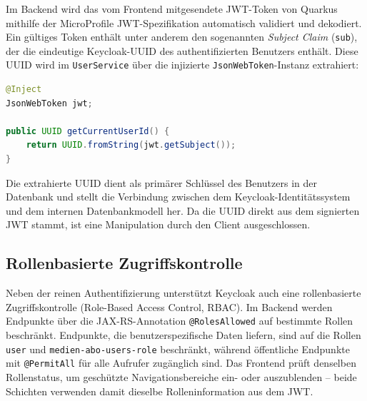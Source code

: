 Im Backend wird das vom Frontend mitgesendete JWT-Token von Quarkus mithilfe
der MicroProfile JWT-Spezifikation automatisch validiert und dekodiert. Ein
gültiges Token enthält unter anderem den sogenannten \textit{Subject Claim}
(\texttt{sub}), der die eindeutige Keycloak-UUID des authentifizierten Benutzers
enthält. Diese UUID wird im \texttt{UserService} über die injizierte
\texttt{JsonWebToken}-Instanz extrahiert:

\begin{lstlisting}[language=java, basicstyle=\ttfamily\small, caption={Extraktion der Benutzer-UUID aus dem JWT im UserService}]
@Inject
JsonWebToken jwt;

public UUID getCurrentUserId() {
    return UUID.fromString(jwt.getSubject());
}
\end{lstlisting}

Die extrahierte UUID dient als primärer Schlüssel des Benutzers in der
Datenbank und stellt die Verbindung zwischen dem Keycloak-Identitätssystem
und dem internen Datenbankmodell her. Da die UUID direkt aus dem signierten
JWT stammt, ist eine Manipulation durch den Client ausgeschlossen.

\subsection{Rollenbasierte Zugriffskontrolle}

Neben der reinen Authentifizierung unterstützt Keycloak auch eine
rollenbasierte Zugriffskontrolle (Role-Based Access Control, RBAC). Im
Backend werden Endpunkte über die JAX-RS-Annotation \texttt{@RolesAllowed}
auf bestimmte Rollen beschränkt. Endpunkte, die benutzerspezifische Daten
liefern, sind auf die Rollen \texttt{user} und \texttt{medien-abo-users-role}
beschränkt, während öffentliche Endpunkte mit \texttt{@PermitAll} für alle
Aufrufer zugänglich sind. Das Frontend prüft denselben Rollenstatus, um
geschützte Navigationsbereiche ein- oder auszublenden -- beide Schichten
verwenden damit dieselbe Rolleninformation aus dem JWT.
